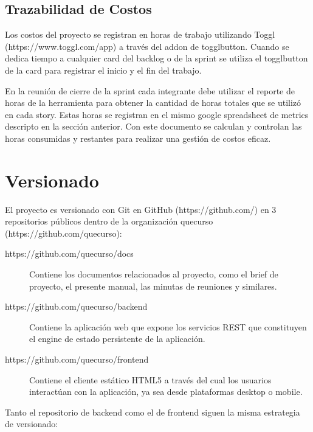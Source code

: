 \documentclass[a4paper,11pt]{article}
\begin{document}
\subsection{Trazabilidad de Costos}

Los costos del proyecto se registran en horas de trabajo utilizando Toggl
(https://www.toggl.com/app) a través del addon de togglbutton. Cuando se dedica
tiempo a cualquier card del backlog o de la sprint se utiliza el togglbutton de
la card para registrar el inicio y el fin del trabajo.

En la reunión de cierre de la sprint cada integrante debe utilizar el reporte
de horas de la herramienta para obtener la cantidad de horas totales que se
utilizó en cada story. Estas horas se registran en el mismo google spreadsheet
de metrics descripto en la sección anterior. Con este documento se calculan y
controlan las horas consumidas y restantes para realizar una gestión de costos
eficaz.

\section{Versionado}

El proyecto es versionado con Git en GitHub (https://github.com/) en 3
repositorios públicos dentro de la organización quecurso
(https://github.com/quecurso):

\begin{description}

  \item[https://github.com/quecurso/docs]

    Contiene los documentos relacionados al proyecto, como el brief de
    proyecto, el presente manual, las minutas de reuniones y similares.

  \item[https://github.com/quecurso/backend]

    Contiene la aplicación web que expone los servicios REST que constituyen el
    engine de estado persistente de la aplicación.

  \item[https://github.com/quecurso/frontend]

    Contiene el cliente estático HTML5 a través del cual los usuarios
    interactúan con la aplicación, ya sea desde plataformas desktop o mobile.

\end{description}

Tanto el repositorio de backend como el de frontend siguen la misma estrategia
de versionado:
\end{document}
